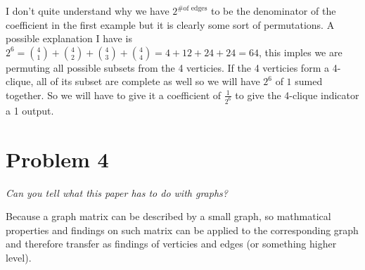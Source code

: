 \documentclass[11pt]{article}
\begin{document}
I don't quite understand why we have $2^{\text{\# of edges}}$ to be the denominator of the coefficient in the first example but it is clearly some sort of permutations. A possible explanation I have is $2^6 = {4 \choose 1} + {4 \choose 2} + {4 \choose 3} + {4 \choose 4} = 4 + 12 + 24 + 24 = 64$, this imples we are permuting all possible subsets from the 4 verticies. If the 4 verticies form a 4-clique, all of its subset are complete as well so we will have $2^6$ of $1$ sumed together. So we will have to give it a coefficient of $\frac{1}{2^6}$ to give the 4-clique indicator a 1 output.


\section*{Problem 4}

\textit{Can you tell what this paper has to do with graphs?}\newline

\noindent Because a graph matrix can be described by a small graph, so mathmatical properties and findings on such matrix can be applied to the corresponding graph and therefore transfer as findings of verticies and edges (or something higher level).
\end{document}
